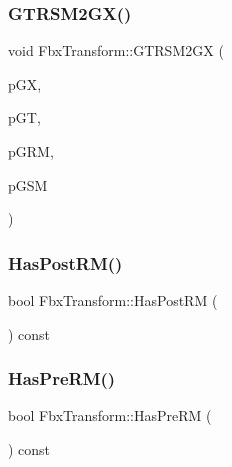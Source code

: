 \subsubsection{\texorpdfstring{G\+T\+R\+S\+M2\+G\+X()}{GTRSM2GX()}}
{\footnotesize\ttfamily void Fbx\+Transform\+::\+G\+T\+R\+S\+M2\+GX (\begin{DoxyParamCaption}\item[{\hyperlink{class_fbx_a_matrix}{Fbx\+A\+Matrix} \&}]{p\+GX,  }\item[{const \hyperlink{class_fbx_vector4}{Fbx\+Vector4} \&}]{p\+GT,  }\item[{const \hyperlink{class_fbx_a_matrix}{Fbx\+A\+Matrix} \&}]{p\+G\+RM,  }\item[{const \hyperlink{class_fbx_a_matrix}{Fbx\+A\+Matrix} \&}]{p\+G\+SM }\end{DoxyParamCaption})}

\mbox{\label{class_fbx_transform_ae853dc92acb8600acf2dc7cb29874118}} 
\subsubsection{\texorpdfstring{Has\+Post\+R\+M()}{HasPostRM()}}
{\footnotesize\ttfamily bool Fbx\+Transform\+::\+Has\+Post\+RM (\begin{DoxyParamCaption}{ }\end{DoxyParamCaption}) const}

\mbox{\label{class_fbx_transform_a60f56f77627047df738fc566fa8a35d8}} 
\subsubsection{\texorpdfstring{Has\+Pre\+R\+M()}{HasPreRM()}}
{\footnotesize\ttfamily bool Fbx\+Transform\+::\+Has\+Pre\+RM (\begin{DoxyParamCaption}{ }\end{DoxyParamCaption}) const}

\mbox{\label{class_fbx_transform_a0f8a508ce59cb0935a8c365c2ff71c10}} 
